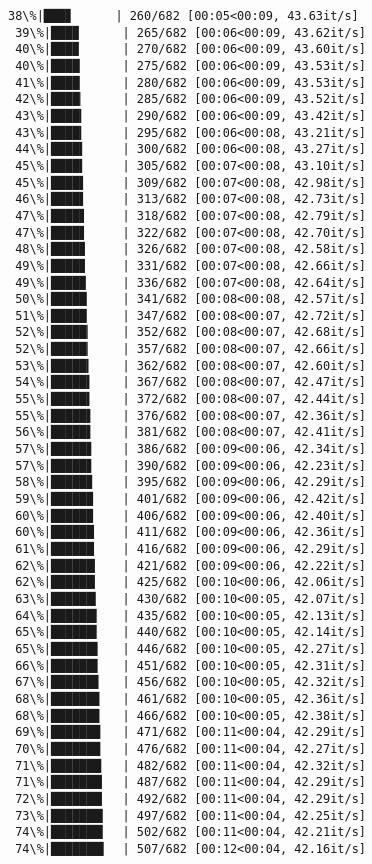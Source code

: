\documentclass[11pt]{article}
\begin{document}
\begin{Verbatim}[commandchars=\\\{\}]
 38\%|███▊      | 260/682 [00:05<00:09, 43.63it/s]
 39\%|███▉      | 265/682 [00:06<00:09, 43.62it/s]
 40\%|███▉      | 270/682 [00:06<00:09, 43.60it/s]
 40\%|████      | 275/682 [00:06<00:09, 43.53it/s]
 41\%|████      | 280/682 [00:06<00:09, 43.53it/s]
 42\%|████▏     | 285/682 [00:06<00:09, 43.52it/s]
 43\%|████▎     | 290/682 [00:06<00:09, 43.42it/s]
 43\%|████▎     | 295/682 [00:06<00:08, 43.21it/s]
 44\%|████▍     | 300/682 [00:06<00:08, 43.27it/s]
 45\%|████▍     | 305/682 [00:07<00:08, 43.10it/s]
 45\%|████▌     | 309/682 [00:07<00:08, 42.98it/s]
 46\%|████▌     | 313/682 [00:07<00:08, 42.73it/s]
 47\%|████▋     | 318/682 [00:07<00:08, 42.79it/s]
 47\%|████▋     | 322/682 [00:07<00:08, 42.70it/s]
 48\%|████▊     | 326/682 [00:07<00:08, 42.58it/s]
 49\%|████▊     | 331/682 [00:07<00:08, 42.66it/s]
 49\%|████▉     | 336/682 [00:07<00:08, 42.64it/s]
 50\%|█████     | 341/682 [00:08<00:08, 42.57it/s]
 51\%|█████     | 347/682 [00:08<00:07, 42.72it/s]
 52\%|█████▏    | 352/682 [00:08<00:07, 42.68it/s]
 52\%|█████▏    | 357/682 [00:08<00:07, 42.66it/s]
 53\%|█████▎    | 362/682 [00:08<00:07, 42.60it/s]
 54\%|█████▍    | 367/682 [00:08<00:07, 42.47it/s]
 55\%|█████▍    | 372/682 [00:08<00:07, 42.44it/s]
 55\%|█████▌    | 376/682 [00:08<00:07, 42.36it/s]
 56\%|█████▌    | 381/682 [00:08<00:07, 42.41it/s]
 57\%|█████▋    | 386/682 [00:09<00:06, 42.34it/s]
 57\%|█████▋    | 390/682 [00:09<00:06, 42.23it/s]
 58\%|█████▊    | 395/682 [00:09<00:06, 42.29it/s]
 59\%|█████▉    | 401/682 [00:09<00:06, 42.42it/s]
 60\%|█████▉    | 406/682 [00:09<00:06, 42.40it/s]
 60\%|██████    | 411/682 [00:09<00:06, 42.36it/s]
 61\%|██████    | 416/682 [00:09<00:06, 42.29it/s]
 62\%|██████▏   | 421/682 [00:09<00:06, 42.22it/s]
 62\%|██████▏   | 425/682 [00:10<00:06, 42.06it/s]
 63\%|██████▎   | 430/682 [00:10<00:05, 42.07it/s]
 64\%|██████▍   | 435/682 [00:10<00:05, 42.13it/s]
 65\%|██████▍   | 440/682 [00:10<00:05, 42.14it/s]
 65\%|██████▌   | 446/682 [00:10<00:05, 42.27it/s]
 66\%|██████▌   | 451/682 [00:10<00:05, 42.31it/s]
 67\%|██████▋   | 456/682 [00:10<00:05, 42.32it/s]
 68\%|██████▊   | 461/682 [00:10<00:05, 42.36it/s]
 68\%|██████▊   | 466/682 [00:10<00:05, 42.38it/s]
 69\%|██████▉   | 471/682 [00:11<00:04, 42.29it/s]
 70\%|██████▉   | 476/682 [00:11<00:04, 42.27it/s]
 71\%|███████   | 482/682 [00:11<00:04, 42.32it/s]
 71\%|███████▏  | 487/682 [00:11<00:04, 42.29it/s]
 72\%|███████▏  | 492/682 [00:11<00:04, 42.29it/s]
 73\%|███████▎  | 497/682 [00:11<00:04, 42.25it/s]
 74\%|███████▎  | 502/682 [00:11<00:04, 42.21it/s]
 74\%|███████▍  | 507/682 [00:12<00:04, 42.16it/s]

\end{Verbatim}
\end{document}

